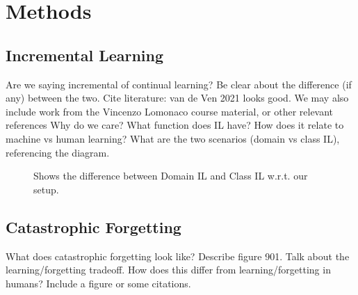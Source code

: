 %

\section{Methods}
\label{sec:methods}

\subsection{Incremental Learning}
\label{sec:m0}

Are we saying incremental of continual learning?
Be clear about the difference (if any) between the two.
Cite literature: van de Ven 2021 looks good. We may also include work from the Vincenzo Lomonaco course material, or other relevant references
Why do we care? What function does IL have? How does it relate to machine vs human learning?
What are the two scenarios (domain vs class IL), referencing the diagram.

\begin{figure}[t]\centering
  \begin{panelbox}
  \end{panelbox}
  \caption{\label{fig:il_diagram}Shows the difference between Domain IL and Class IL w.r.t. our setup.}
\end{figure}

\subsection{Catastrophic Forgetting}
\label{sec:m1}

What does catastrophic forgetting look like? Describe figure 901.
Talk about the learning/forgetting tradeoff.
How does this differ from learning/forgetting in humans? Include a figure or some citations.

